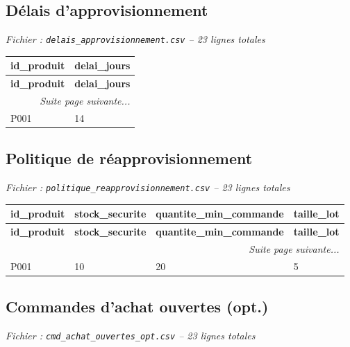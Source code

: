 \documentclass[a4paper,11pt]{article}
\begin{document}
\newpage

\subsection{Délais d'approvisionnement}

\textit{Fichier : \texttt{delais\_approvisionnement.csv} -- 23 lignes totales
}


\scriptsize
\begin{longtable}{|l|l|}
\hline
\rowcolor{headerblue}
\textbf{id\_produit} & \textbf{delai\_jours} \\ \hline
\endfirsthead
\hline
\rowcolor{headerblue}
\textbf{id\_produit} & \textbf{delai\_jours} \\ \hline
\endhead
\hline \multicolumn{2}{|r|}{\textit{Suite page suivante...}} \\ \hline
\endfoot
\hline
\endlastfoot
 P001 & 14 \\ \hline
\end{longtable}
\normalsize

\newpage

\subsection{Politique de réapprovisionnement}

\textit{Fichier : \texttt{politique\_reapprovisionnement.csv} -- 23 lignes totales
}


\scriptsize
\begin{longtable}{|l|l|l|l|}
\hline
\rowcolor{headerblue}
\textbf{id\_produit} & \textbf{stock\_securite} & \textbf{quantite\_min\_commande} & \textbf{taille\_lot} \\ \hline
\endfirsthead
\hline
\rowcolor{headerblue}
\textbf{id\_produit} & \textbf{stock\_securite} & \textbf{quantite\_min\_commande} & \textbf{taille\_lot} \\ \hline
\endhead
\hline \multicolumn{4}{|r|}{\textit{Suite page suivante...}} \\ \hline
\endfoot
\hline
\endlastfoot
 P001 & 10 & 20 & 5 \\ \hline
\end{longtable}
\normalsize

\newpage

\subsection{Commandes d'achat ouvertes (opt.)}

\textit{Fichier : \texttt{cmd\_achat\_ouvertes\_opt.csv} -- 23 lignes totales
}
\end{document}
